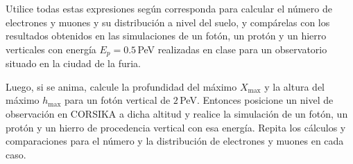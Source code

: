 \documentclass[11pt]{article}
\begin{document}
\begin{enumerate}
		Utilice todas estas expresiones según corresponda para calcular el
		número de electrones y muones y su distribución a nivel del suelo, y
		compárelas con los resultados obtenidos en las simulaciones de un
		fotón, un protón y un hierro verticales con energía $E_p=0.5$\,PeV
		realizadas en clase para un observatorio situado en la ciudad de la
		furia.
		
		Luego, si se anima, calcule la profundidad del máximo $X_{\max}$ y la
		altura del máximo $h_{\max}$ para un fotón vertical de $2$\,PeV.
		Entonces posicione un nivel de observación en CORSIKA a dicha altitud y
		realice la simulación de un fotón, un protón y un hierro de procedencia
		vertical con esa energía. Repita los cálculos y comparaciones para el
		número y la distribución de electrones y muones en cada caso. 
\end{enumerate}
\end{document}
